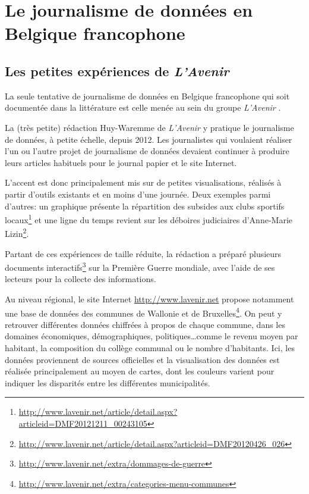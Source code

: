 
\chapter{Le journalisme de données en Belgique francophone}

\section{Les petites expériences de \textit{L'Avenir}}
La seule tentative de journalisme de données en Belgique francophone qui soit documentée dans la littérature est celle menée au sein du groupe \textit{L'Avenir} \cite{handbookfr}.

La (très petite) rédaction Huy-Waremme de \textit{L'Avenir} y pratique le journalisme de données, à petite échelle, depuis 2012. Les journalistes qui voulaient réaliser l'un ou l'autre projet de journalisme de données devaient continuer à produire leurs articles habituels pour le journal papier et le site Internet.

L'accent est donc principalement mis sur de petites visualisations, réalisés à partir d'outils existants et en moins d'une journée. Deux exemples parmi d'autres: un graphique présente la répartition des subsides aux clubs sportifs locaux\footnote{\url{http://www.lavenir.net/article/detail.aspx?articleid=DMF20121211_00243105}} et une ligne du temps revient sur les déboires judiciaires d'Anne-Marie Lizin\footnote{\url{http://www.lavenir.net/article/detail.aspx?articleid=DMF20120426_026}}.

Partant de ces expériences de taille réduite, la rédaction a préparé plusieurs documents interactifs\footnote{\url{http://www.lavenir.net/extra/dommages-de-guerre}} sur la Première Guerre mondiale, avec l'aide de ses lecteurs pour la collecte des informations.

Au niveau régional, le site Internet \url{http://www.lavenir.net} propose notamment une base de données des communes de Wallonie et de Bruxelles\footnote{\url{http://www.lavenir.net/extra/categories-menu-communes}}. On peut y retrouver différentes données chiffrées à propos de chaque commune, dans les domaines économiques, démographiques, politiques\dots comme le revenu moyen par habitant, la composition du collège communal ou le nombre d'habitants. Ici, les données proviennent de sources officielles et la visualisation des données est réalisée principalement au moyen de cartes, dont les couleurs varient pour indiquer les disparités entre les différentes municipalités. 

